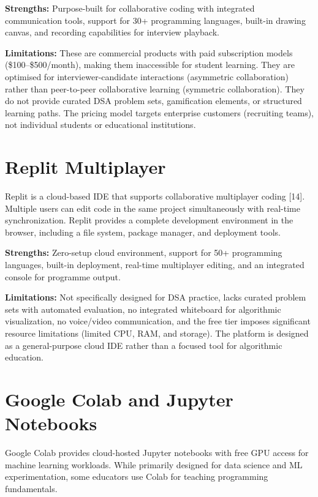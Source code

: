 \textbf{Strengths:} Purpose-built for collaborative coding with integrated communication tools, support for 30+ programming languages, built-in drawing canvas, and recording capabilities for interview playback.

\textbf{Limitations:} These are commercial products with paid subscription models (\$100--\$500/month), making them inaccessible for student learning. They are optimised for interviewer-candidate interactions (asymmetric collaboration) rather than peer-to-peer collaborative learning (symmetric collaboration). They do not provide curated DSA problem sets, gamification elements, or structured learning paths. The pricing model targets enterprise customers (recruiting teams), not individual students or educational institutions.

\section{Replit Multiplayer}

Replit is a cloud-based IDE that supports collaborative multiplayer coding [14]. Multiple users can edit code in the same project simultaneously with real-time synchronization. Replit provides a complete development environment in the browser, including a file system, package manager, and deployment tools.

\textbf{Strengths:} Zero-setup cloud environment, support for 50+ programming languages, built-in deployment, real-time multiplayer editing, and an integrated console for programme output.

\textbf{Limitations:} Not specifically designed for DSA practice, lacks curated problem sets with automated evaluation, no integrated whiteboard for algorithmic visualization, no voice/video communication, and the free tier imposes significant resource limitations (limited CPU, RAM, and storage). The platform is designed as a general-purpose cloud IDE rather than a focused tool for algorithmic education.

\section{Google Colab and Jupyter Notebooks}

Google Colab provides cloud-hosted Jupyter notebooks with free GPU access for machine learning workloads. While primarily designed for data science and ML experimentation, some educators use Colab for teaching programming fundamentals.

